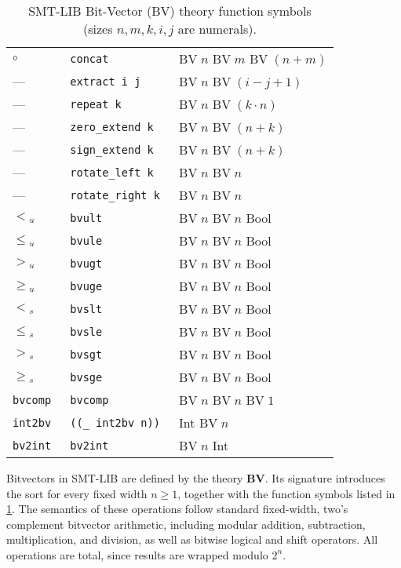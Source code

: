 \begin{table}
\begin{tabular}{lll}
$\circ$ & \tt{concat} & \(\mathrm{BV}\;n\)\; \(\mathrm{BV}\;m\)\; \(\mathrm{BV}\;(n{+}m)\) \\
— & \tt{extract i j} & \(\mathrm{BV}\;n\)\; \(\mathrm{BV}\;(i{-}j{+}1)\) \\
— & \tt{repeat k} & \(\mathrm{BV}\;n\)\; \(\mathrm{BV}\;(k\cdot n)\) \\
— & \tt{zero\_extend k} & \(\mathrm{BV}\;n\)\; \(\mathrm{BV}\;(n{+}k)\) \\
— & \tt{sign\_extend k} & \(\mathrm{BV}\;n\)\; \(\mathrm{BV}\;(n{+}k)\) \\
— & \tt{rotate\_left k} & \(\mathrm{BV}\;n\)\; \(\mathrm{BV}\;n\) \\
— & \tt{rotate\_right k} & \(\mathrm{BV}\;n\)\; \(\mathrm{BV}\;n\) \\
$<$\(_u\) & \tt{bvult} & \(\mathrm{BV}\;n\)\; \(\mathrm{BV}\;n\)\; Bool \\
$\le$\(_u\) & \tt{bvule} & \(\mathrm{BV}\;n\)\; \(\mathrm{BV}\;n\)\; Bool \\
$>$\(_u\) & \tt{bvugt} & \(\mathrm{BV}\;n\)\; \(\mathrm{BV}\;n\)\; Bool \\
$\ge$\(_u\) & \tt{bvuge} & \(\mathrm{BV}\;n\)\; \(\mathrm{BV}\;n\)\; Bool \\
$<$\(_s\) & \tt{bvslt} & \(\mathrm{BV}\;n\)\; \(\mathrm{BV}\;n\)\; Bool \\
$\le$\(_s\) & \tt{bvsle} & \(\mathrm{BV}\;n\)\; \(\mathrm{BV}\;n\)\; Bool \\
$>$\(_s\) & \tt{bvsgt} & \(\mathrm{BV}\;n\)\; \(\mathrm{BV}\;n\)\; Bool \\
$\ge$\(_s\) & \tt{bvsge} & \(\mathrm{BV}\;n\)\; \(\mathrm{BV}\;n\)\; Bool \\
\tt{bvcomp} & \tt{bvcomp} & \(\mathrm{BV}\;n\)\; \(\mathrm{BV}\;n\)\; \(\mathrm{BV}\;1\) \\
\tt{int2bv} & \tt{((\_ \tt{int2bv}~n))} & Int \;\(\mathrm{BV}\;n\) \\
\tt{bv2int} & \tt{bv2int} & \(\mathrm{BV}\;n\)\; Int \\
\bottomrule
\end{tabular}
\caption{SMT-LIB Bit-Vector (BV) theory function symbols\\ (sizes \(n,m,k,i,j\) are numerals).}
\label{tab:bv-funs}
\end{table}

Bitvectors in SMT-LIB are defined by the theory \textbf{BV}.
Its signature introduces the sort  for every fixed width $n \geq 1$, together with the function symbols listed in \cref{tab:bv-funs}.
The semantics of these operations follow standard fixed-width, two's complement bitvector arithmetic, including modular addition, subtraction, multiplication, and division, as well as bitwise logical and shift operators.
All operations are total, since results are wrapped modulo $2^n$.



